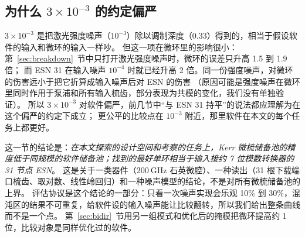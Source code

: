 \subsection{为什么 $3\times10^{-3}$ 的约定偏严}

$3\times10^{-3}$ 是把激光强度噪声（$10^{-3}$）除以调制深度（$0.33$）得到的，相当于假设软件的输入和微环的输入一样吵。
但这一项在微环里的影响很小：第~\ref{sec:breakdown}~节中只打开激光强度噪声时，微环的误差只升高 1.5 到 1.9 倍；
而 ESN 31 在输入噪声 $10^{-4}$ 时就已经升高 2 倍。同一份强度噪声，对微环的伤害远小于把它折算成输入噪声后对 ESN 的伤害
（原因可能是强度噪声在微环里同时作用于泵浦和所有输入梳齿，部分表现为共模的变化，我们没有单独验证）。
所以 $3\times10^{-3}$ 对软件偏严，前几节中“与 ESN 31 持平”的说法都应理解为在这个偏严的约定下成立；
更公平的比较点在 $10^{-3}$ 附近，那里软件在本文的每个任务上都更好。

这一节的结论是：\emph{在本文探索的设计空间和考察的任务上，Kerr 微梳储备池的精度低于同规模的软件储备池；找到的最好单环相当于输入接约 7 位模数转换器的 31 节点 ESN}。
这是关于一类器件（$200~\mathrm{GHz}$ 石英微腔）、一种读出（31 根下载端口梳齿、取对数、线性岭回归）和一种噪声模型的结论，不是对所有微梳储备池的上界。
评估协议是这个结论的一部分：只看一次噪声实现会乐观 10\% 到 30\%，混沌区的结果不可重复，给软件设的输入噪声能让比较翻转，所以我们给出整条曲线而不是一个点。
第~\ref{sec:bidir}~节用另一组模式和优化后的掩模把微环提高约 1 位，比较对象是同样优化过的软件。
